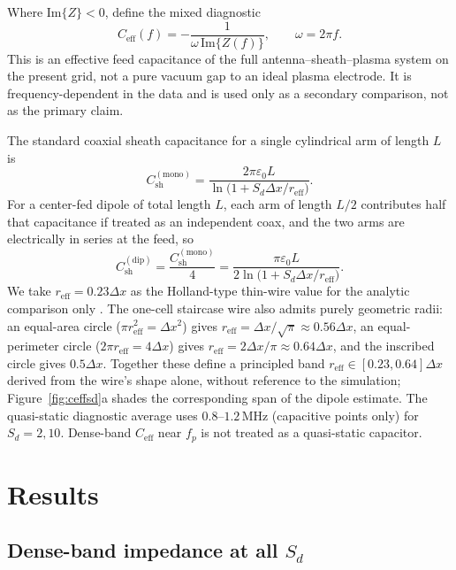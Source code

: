 \documentclass[draft]{agujournal2025}
\begin{document}
Where \(\mathrm{Im}\{Z\}<0\), define the mixed diagnostic
\begin{equation}
C_\mathrm{eff}(f)=-\frac{1}{\omega\,\mathrm{Im}\{Z(f)\}},
\qquad \omega=2\pi f.
\label{eq:ceff}
\end{equation}
This is an effective feed capacitance of the full antenna--sheath--plasma system on the present grid, not a pure vacuum gap to an ideal plasma electrode. It is frequency-dependent in the data and is used only as a secondary comparison, not as the primary claim.

The standard coaxial sheath capacitance for a single cylindrical arm of length \(L\) is
\begin{equation}
C_\mathrm{sh}^\mathrm{(mono)}=\frac{2\pi\varepsilon_0 L}{\ln\!\bigl(1+S_d\Delta x/r_\mathrm{eff}\bigr)}.
\label{eq:coax_mono}
\end{equation}
For a center-fed dipole of total length \(L\), each arm of length \(L/2\) contributes half that capacitance if treated as an independent coax, and the two arms are electrically in series at the feed, so
\begin{equation}
C_\mathrm{sh}^\mathrm{(dip)}=\frac{C_\mathrm{sh}^\mathrm{(mono)}}{4}
=\frac{\pi\varepsilon_0 L}{2\ln\!\bigl(1+S_d\Delta x/r_\mathrm{eff}\bigr)}.
\label{eq:coax_dip}
\end{equation}
We take \(r_\mathrm{eff}=0.23\Delta x\) as the Holland-type thin-wire value for the analytic comparison only \cite{holland1981}. The one-cell staircase wire also admits purely geometric radii: an equal-area circle (\(\pi r_\mathrm{eff}^2=\Delta x^2\)) gives \(r_\mathrm{eff}=\Delta x/\sqrt{\pi}\approx 0.56\Delta x\), an equal-perimeter circle (\(2\pi r_\mathrm{eff}=4\Delta x\)) gives \(r_\mathrm{eff}=2\Delta x/\pi\approx 0.64\Delta x\), and the inscribed circle gives \(0.5\Delta x\). Together these define a principled band \(r_\mathrm{eff}\in[0.23,0.64]\Delta x\) derived from the wire's shape alone, without reference to the simulation; Figure~\ref{fig:ceffsd}a shades the corresponding span of the dipole estimate. The quasi-static diagnostic average uses \(0.8\)--\(1.2\,\mathrm{MHz}\) (capacitive points only) for \(S_d=2,10\). Dense-band \(C_\mathrm{eff}\) near \(f_p\) is not treated as a quasi-static capacitor.

\section{Results}

\subsection{Dense-band impedance at all \(S_d\)}
\end{document}
